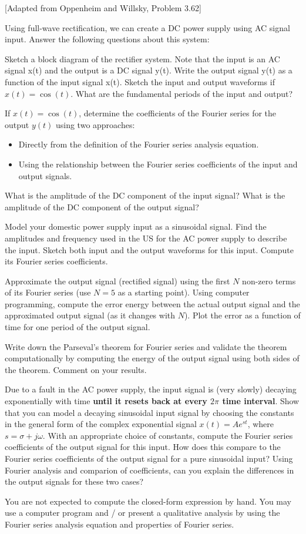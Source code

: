 \documentclass{ee102_pset}
\author{\rule{3cm}{0.4pt}} %
\begin{document}

[Adapted from Oppenheim and Willsky, Problem 3.62]

Using full-wave rectification, we can create a DC power supply using AC signal input. Answer the following questions about this system:

\problempart[5 points] Sketch a block diagram of the rectifier system. Note that the input is an AC signal x(t) and the output is a DC signal y(t).
\problempart[5 points] Write the output signal y(t) as a function of the input signal x(t).
\problempart[5 points] Sketch the input and output waveforms if $x(t) = \cos(t)$. What are the fundamental periods of the input and output?

\problempart[20 points] If $x(t) = \cos(t)$, determine the coefficients of the Fourier series for the output $y(t)$ using two approaches: 
\begin{itemize}
\item Directly from the definition of the Fourier series analysis equation.
\item Using the relationship between the Fourier series coefficients of the input and output signals.
\end{itemize}

\problempart[10 points] What is the amplitude of the DC component of the input signal? What is the amplitude of the DC component of the output signal?

\problempart[10 points] Model your domestic power supply input as a sinusoidal signal. Find the amplitudes and frequency used in the US for the AC power supply to describe the input. Sketch both input and the output waveforms for this input. Compute its Fourier series coefficients.

\problempart[20 points] Approximate the output signal (rectified signal) using the first $N$ non-zero terms of its Fourier series (use $N = 5$ as a starting point). Using computer programming, compute the error energy between the actual output signal and the approximated output signal (as it changes with $N$). Plot the error as a function of time for one period of the output signal.

\problempart[15 points] Write down the Parseval's theorem for Fourier series and validate the theorem computationally by computing the energy of the output signal using both sides of the theorem. Comment on your results.

\problempart[10 points] Due to a fault in the AC power supply, the input signal is (very slowly) decaying exponentially with time \textbf{until it resets back at every $2\pi$ time interval}. Show that you can model a decaying sinusoidal input signal by choosing the constants in the general form of the complex exponential signal $x(t) = Ae^{st}$, where $s = \sigma + j\omega$. With an appropriate choice of constants, compute the Fourier series coefficients of the output signal for this input. How does this compare to the Fourier series coefficients of the output signal for a pure sinusoidal input? Using Fourier analysis and comparion of coefficients, can you explain the differences in the output signals for these two cases?


{\color{blue} You are not expected to compute the closed-form expression by hand. You may use a computer program and / or present a qualitative analysis by using the Fourier series analysis equation and properties of Fourier series.}
\end{document}
